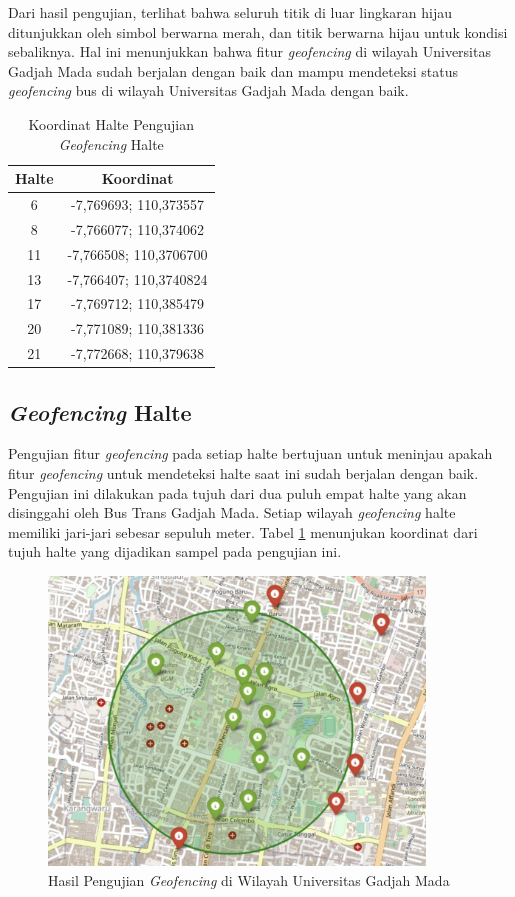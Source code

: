 Dari hasil pengujian, terlihat bahwa seluruh titik di luar lingkaran hijau ditunjukkan oleh simbol berwarna merah, dan titik berwarna hijau untuk kondisi sebaliknya. Hal ini menunjukkan bahwa fitur \textit{geofencing} di wilayah Universitas Gadjah Mada sudah berjalan dengan baik dan mampu mendeteksi status \textit{geofencing} bus di wilayah Universitas Gadjah Mada dengan baik.

\begin{table}[H]
	\caption{Koordinat Halte Pengujian \textit{Geofencing} Halte}
	\vspace{0.5em}
	\centering
	\begin{tabular}{cc}
		\hline
		\textbf{Halte} &\textbf{Koordinat} \\
		\hline
		6 & -7,769693; 110,373557 \\
		8 &-7,766077; 110,374062\\ 
		11 &-7,766508; 110,3706700\\
		13 & -7,766407; 110,3740824\\
		17 &-7,769712; 110,385479\\ 
		20 & -7,771089; 110,381336\\
		21 & -7,772668; 110,379638\\
		\hline
	\end{tabular}
	\label{Tab: geofencing-2}
\end{table}

\subsection{\textit{Geofencing} Halte}
Pengujian fitur \textit{geofencing} pada setiap halte bertujuan untuk meninjau apakah fitur \textit{geofencing} untuk mendeteksi halte saat ini sudah berjalan dengan baik. Pengujian ini dilakukan pada tujuh dari dua puluh empat halte yang akan disinggahi oleh Bus Trans Gadjah Mada. Setiap wilayah \textit{geofencing} halte memiliki jari-jari sebesar sepuluh meter. Tabel \ref{Tab: geofencing-2} menunjukan koordinat dari tujuh halte yang dijadikan sampel pada pengujian ini.

\begin{figure}[H]
	\centering
	\includegraphics[width=10cm]{contents/chapter-4/geofencing/wilayah-ugm.jpg}
	\caption{Hasil Pengujian \textit{Geofencing} di Wilayah Universitas Gadjah Mada}
	\label{Fig: geofencing-1}
\end{figure}

